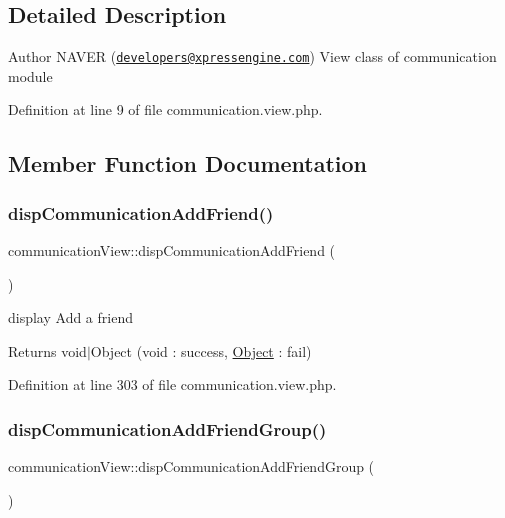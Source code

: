 \subsection{Detailed Description}
\begin{DoxyAuthor}{Author}
N\+A\+V\+ER (\href{mailto:developers@xpressengine.com}{\tt developers@xpressengine.\+com}) View class of communication module 
\end{DoxyAuthor}


Definition at line 9 of file communication.\+view.\+php.



\subsection{Member Function Documentation}
\mbox{\label{classcommunicationView_a481636c7776213713b950a827aa6f728}} 
\subsubsection{\texorpdfstring{disp\+Communication\+Add\+Friend()}{dispCommunicationAddFriend()}}
{\footnotesize\ttfamily communication\+View\+::disp\+Communication\+Add\+Friend (\begin{DoxyParamCaption}{ }\end{DoxyParamCaption})}

display Add a friend \begin{DoxyReturn}{Returns}
void$\vert$\+Object (void \+: success, \hyperlink{classObject}{Object} \+: fail) 
\end{DoxyReturn}


Definition at line 303 of file communication.\+view.\+php.

\mbox{\label{classcommunicationView_a6675ce671029732a7d5d6428287ddd4b}} 
\subsubsection{\texorpdfstring{disp\+Communication\+Add\+Friend\+Group()}{dispCommunicationAddFriendGroup()}}
{\footnotesize\ttfamily communication\+View\+::disp\+Communication\+Add\+Friend\+Group (\begin{DoxyParamCaption}{ }\end{DoxyParamCaption})}


